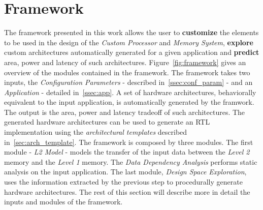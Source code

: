 \section{Framework}
\label{sec:framework}
The framework presented in this work allows the user to \textbf{customize} the elements to be used in the design of the \textit{Custom Processor} and \textit{Memory System}, \textbf{explore} custom architectures automatically generated for a given application and \textbf{predict} area, power and latency of such architectures. Figure~\ref{fig:framework} gives an overview of the modules contained in the framework. The framework takes two inputs, the \textit{Configuration Parameters} - described in~\ref{ssec:conf_param} - and an \textit{Application} - detailed in~\ref{ssec:app}. A set of hardware architectures, behaviorally equivalent to the input application, is automatically generated by the framwork. The output is the area, power and latency tradeoff of such architectures. The generated hardware architectures can be used to generate an RTL implementation using the \textit{architectural templates} described in~\ref{sec:arch_template}.
The framework is composed by three modules. The first module - \textit{L2 Model} - models the transfer of the input data between the \textit{Level 2} memory and the \textit{Level 1} memory. The \textit{Data Dependency Analysis} performs static analysis on the input application. The last module, \textit{Design Space Exploration}, uses the information extracted by the previous step to procedurally generate hardware architectures.
The rest of this section will describe more in detail the inputs and modules of the framework.



%

